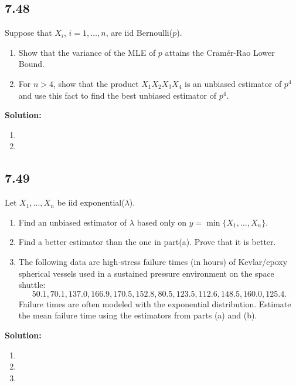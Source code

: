 \documentclass[11pt]{article}
\newcommand{\Sol}{\par {\bf Solution:}}
\newcommand{\sample}[1]{#1_1 , \dots , #1_n}
\begin{document}
\subsection*{7.48}
Suppose that $X_i$, $i = 1, \dots, n$, are iid Bernoulli($p$).
\begin{enumerate}[label=(\alph*)]
    \item Show that the variance of the MLE of $p$ attains the Cram\'{e}r-Rao Lower Bound.
    \item For $n > 4$, show that the product $X_1X_2X_3X_4$ is an unbiased estimator of $p^4$ and use this fact to find the best unbiased estimator of $p^4$.
\end{enumerate}

\Sol
\begin{enumerate}[label=(\alph*)]
    \item
    \item
\end{enumerate}

\subsection*{7.49}
Let $\sample X$ be iid exponential($\lambda$).
\begin{enumerate}[label=(\alph*)]
    \item Find an unbiased estimator of $\lambda$ based only on $y = \min\{\sample X\}$.
    \item Find a better estimator than the one in part(a). Prove that it is better.
    \item The following data are high-stress failure times (in hours) of Kevlar/epoxy spherical vessels used in a sustained pressure environment on the space shuttle:
    \[
    50.1, 70.1, 137.0, 166.9, 170.5, 152.8, 80.5, 123.5, 112.6, 148.5, 160.0, 125.4.
    \]
    Failure times are often modeled with the exponential distribution. Estimate the mean failure time using the estimators from parts (a) and (b).
\end{enumerate}

\Sol
\begin{enumerate}[label=(\alph*)]
    \item
    \item
    \item
\end{enumerate}
\end{document}
